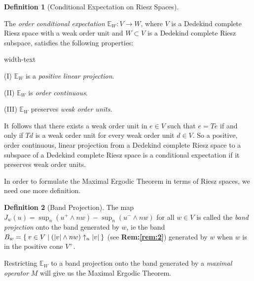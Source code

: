 \documentclass[letterpaper,10pt,oneside,onecolumn,reqno]{amsart}
\newcommand{\E}{\mathbb E}
\theoremstyle{definition}
\newtheorem{defn}{Definition}
\newcommand{\meet}{\wedge}
\begin{document}
\begin{defn}[Conditional Expectation on Riesz Spaces]\label{def:15}

  The \emph{order conditional
    expectation} $\E_W: V \to W$, where $V$ is a Dedekind
  complete Riesz space with a weak order unit and $W \subset V$ is a
  Dedekind complete Riesz subspace, satisfies the following
  properties:

  \begin{deflist}{width-text}
  \item[(I)] $\E_W$ is a \emph{positive linear projection}.
  \item[(II)] $\E_W$ is \emph{order continuous}.
  \item[(III)] $\E_W$ preserves \emph{weak order units}.
  \end{deflist}
\end{defn}

\begin{framed}
  It follows that there exists a weak order unit in $e \in V$ such
  that $e = Te$ if and only if $Td$ is a weak order unit for every
  weak order unit $d \in V$. So a positive, order continuous, linear
  projection from a Dedekind complete Riesz space to a subspace of a
  Dedekind complete Riesz space is a conditional expectation if it
  preserves weak order units.
\end{framed}

In order to formulate the Maximal Ergodic Theorem in terms of Riesz
spaces, we need one more definition.

\begin{defn}[Band Projection]\label{def:16}
  The map $J_w(u) = \sup_n (u^+ \meet nw) - \sup_n(u^- \meet nw)$ for
  all $w \in V$ is called the \emph{band
    projection} onto the band generated by $w$, ie the band $B_w =
  \Set{v \in V | (|v| \meet nw) \uparrow_n |v|}$ (see
  \textbf{Rem:\ref{rem:2}}) generated by $w$ when $w$ is in the
  positive cone $V^+$.
\end{defn}

Restricting $\E_W$ to a band projection onto the band generated
by a \emph{maximal operator} $M$ will give us
the Maximal Ergodic Theorem.
\end{document}
